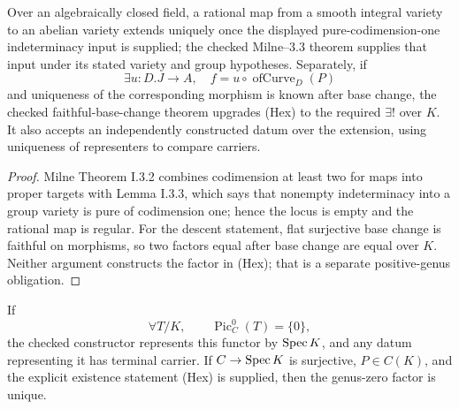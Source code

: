 \begin{theorem}
  \label{route-thm-albanese-substrate}
  \leanok

  Over an algebraically closed field, a rational map from a smooth integral
  variety to an abelian variety extends uniquely once the displayed
  pure-codimension-one indeterminacy input is supplied; the checked Milne--3.3
  theorem supplies that input under its stated variety and group hypotheses.
  Separately, if
  \[
    \exists u:D.J\to A,\quad f=u\circ\operatorname{ofCurve}_D(P)
    \tag{Hex}
  \]
  and uniqueness of the corresponding morphism is known after base change,
  the checked faithful-base-change theorem upgrades (Hex) to the required
  \(\exists!\) over \(K\).  It also accepts an independently constructed datum
  over the extension, using uniqueness of representers to compare carriers.
\end{theorem}

\begin{proof}
  Milne Theorem I.3.2 combines codimension at least two for maps into proper
  targets with Lemma I.3.3, which says that nonempty indeterminacy into a group
  variety is pure of codimension one; hence the locus is empty and the rational
  map is regular.  For the descent statement, flat surjective base change is
  faithful on morphisms, so two factors equal after base change are equal over
  \(K\).  Neither argument constructs the factor in (Hex); that is a separate
  positive-genus obligation.
\end{proof}

\begin{theorem}
  \label{route-thm-genus-zero-conditional}
  \leanok

  If
  \[
    \forall T/K,\qquad \operatorname{Pic}^0_C(T)=\{0\},
    \tag{V0}
  \]
  the checked constructor represents this functor by \(\operatorname{Spec} K\), and any
  datum representing it has terminal carrier.  If \(C\to\operatorname{Spec} K\) is
  surjective, \(P\in C(K)\), and the explicit existence statement (Hex) is
  supplied, then the genus-zero factor is unique.
\end{theorem}

